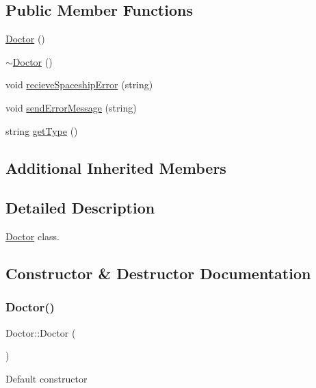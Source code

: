 \subsection*{Public Member Functions}
\begin{DoxyCompactItemize}
\item 
\hyperlink{classDoctor_ac71a90316796a8e72a8d9db536de274a}{Doctor} ()
\item 
\hyperlink{classDoctor_a1481ccfafebc7a2424d3659a0223ebfe}{$\sim$\+Doctor} ()
\item 
void \hyperlink{classDoctor_a820dca3b9f05d3f69c47bd7318923b88}{recieve\+Spaceship\+Error} (string)
\item 
void \hyperlink{classDoctor_a5a524981ce52102f975cf9c569137ce5}{send\+Error\+Message} (string)
\item 
string \hyperlink{classDoctor_a6aee07e1096c01e16c11b461150083eb}{get\+Type} ()
\end{DoxyCompactItemize}
\subsection*{Additional Inherited Members}


\subsection{Detailed Description}
\hyperlink{classDoctor}{Doctor} class. 

\subsection{Constructor \& Destructor Documentation}
\mbox{\label{classDoctor_ac71a90316796a8e72a8d9db536de274a}} 
\subsubsection{\texorpdfstring{Doctor()}{Doctor()}}
{\footnotesize\ttfamily Doctor\+::\+Doctor (\begin{DoxyParamCaption}{ }\end{DoxyParamCaption})\hspace{0.3cm}{\ttfamily [inline]}}

Default constructor \mbox{\label{classDoctor_a1481ccfafebc7a2424d3659a0223ebfe}} 
